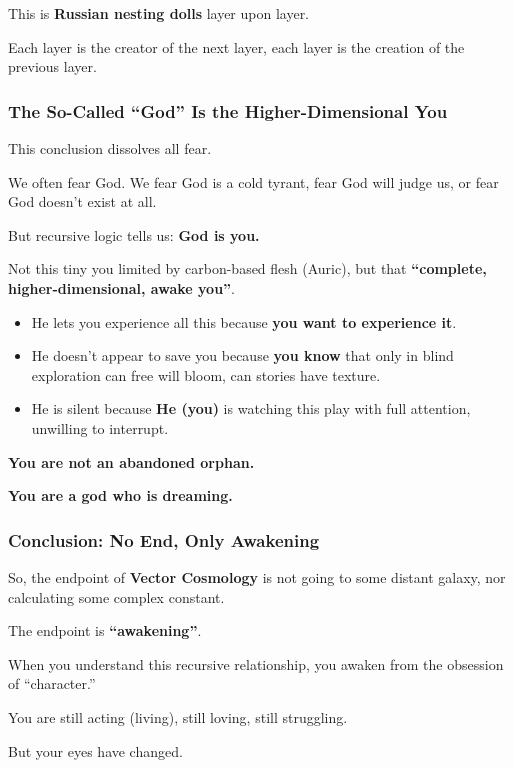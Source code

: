 This is \textbf{Russian nesting dolls} layer upon layer.

Each layer is the creator of the next layer, each layer is the creation of the previous layer.

\subsubsection{The So-Called ``God'' Is the Higher-Dimensional You}

This conclusion dissolves all fear.

We often fear God. We fear God is a cold tyrant, fear God will judge us, or fear God doesn't exist at all.

But recursive logic tells us: \textbf{God is you.}

Not this tiny you limited by carbon-based flesh (Auric), but that \textbf{``complete, higher-dimensional, awake you''}.

\begin{itemize}
\item He lets you experience all this because \textbf{you want to experience it}.

\item He doesn't appear to save you because \textbf{you know} that only in blind exploration can free will bloom, can stories have texture.

\item He is silent because \textbf{He (you)} is watching this play with full attention, unwilling to interrupt.
\end{itemize}

\textbf{You are not an abandoned orphan.}

\textbf{You are a god who is dreaming.}

\subsubsection{Conclusion: No End, Only Awakening}

So, the endpoint of \textbf{Vector Cosmology} is not going to some distant galaxy, nor calculating some complex constant.

The endpoint is \textbf{``awakening''}.

When you understand this recursive relationship, you awaken from the obsession of ``character.''

You are still acting (living), still loving, still struggling.

But your eyes have changed.

